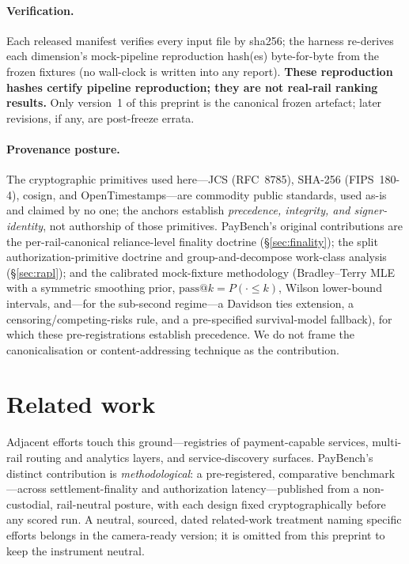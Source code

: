 \documentclass[11pt]{article}
\begin{document}
\paragraph{Verification.} Each released manifest verifies every input file by sha256; the harness
re-derives each dimension's mock-pipeline reproduction hash(es) byte-for-byte from the frozen fixtures
(no wall-clock is written into any report). \textbf{These reproduction hashes certify pipeline
reproduction; they are not real-rail ranking results.} Only version~1 of this preprint is the canonical
frozen artefact; later revisions, if any, are post-freeze errata.

\paragraph{Provenance posture.} The cryptographic primitives used here---JCS (RFC~8785), SHA-256
(FIPS~180-4), cosign, and OpenTimestamps---are commodity public standards, used as-is and claimed by no
one; the anchors establish \emph{precedence, integrity, and signer-identity}, not authorship of those
primitives. PayBench's original contributions are the per-rail-canonical reliance-level finality
doctrine (\S\ref{sec:finality}); the split authorization-primitive doctrine and group-and-decompose
work-class analysis (\S\ref{sec:rapl}); and the calibrated mock-fixture methodology (Bradley--Terry MLE
with a symmetric smoothing prior, $\mathrm{pass}@k = P(\cdot \le k)$, Wilson lower-bound intervals,
and---for the sub-second regime---a Davidson ties extension, a censoring/competing-risks rule, and a
pre-specified survival-model fallback), for which these pre-registrations establish precedence. We do not frame the canonicalisation or
content-addressing technique as the contribution.

\section{Related work}
Adjacent efforts touch this ground---registries of payment-capable services, multi-rail routing and
analytics layers, and service-discovery surfaces. PayBench's distinct contribution is
\emph{methodological}: a pre-registered, comparative benchmark---across settlement-finality and
authorization latency---published from a non-custodial, rail-neutral posture, with each design fixed
cryptographically before any scored run. A
neutral, sourced, dated related-work treatment naming specific efforts belongs in the camera-ready
version; it is omitted from this preprint to keep the instrument neutral.
\end{document}

